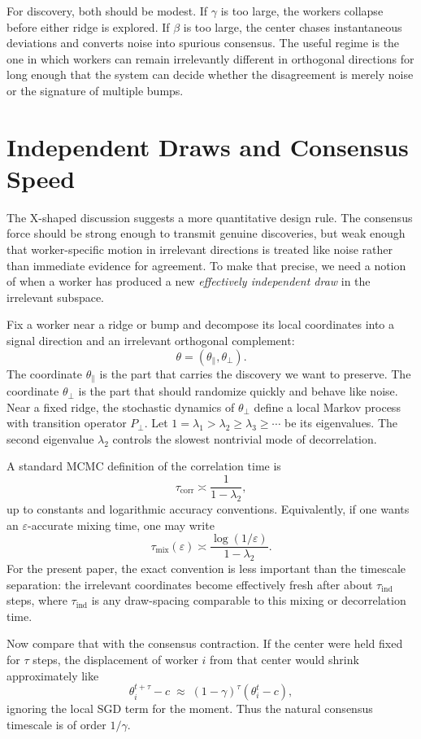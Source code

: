\documentclass{article}
\begin{document}
For discovery, both should be modest. If $\gamma$ is too large, the
workers collapse before either ridge is explored. If $\beta$ is too
large, the center chases instantaneous deviations and converts noise
into spurious consensus. The useful regime is the one in which workers
can remain irrelevantly different in orthogonal directions for long
enough that the system can decide whether the disagreement is merely
noise or the signature of multiple bumps.

\section{Independent Draws and Consensus Speed}

The X-shaped discussion suggests a more quantitative design rule. The
consensus force should be strong enough to transmit genuine discoveries,
but weak enough that worker-specific motion in irrelevant directions is
treated like noise rather than immediate evidence for agreement. To make
that precise, we need a notion of when a worker has produced a new
\emph{effectively independent draw} in the irrelevant subspace.

Fix a worker near a ridge or bump and decompose its local coordinates
into a signal direction and an irrelevant orthogonal complement:
\[
\theta = (\theta_{\parallel}, \theta_{\perp}).
\]
The coordinate $\theta_{\parallel}$ is the part that carries the
discovery we want to preserve. The coordinate $\theta_{\perp}$ is the
part that should randomize quickly and behave like noise. Near a fixed
ridge, the stochastic dynamics of $\theta_{\perp}$ define a local Markov
process with transition operator $P_{\perp}$. Let
$1 = \lambda_1 > \lambda_2 \geq \lambda_3 \geq \cdots$ be its
eigenvalues. The second eigenvalue $\lambda_2$ controls the slowest
nontrivial mode of decorrelation.

A standard MCMC definition of the correlation time is
\[
\tau_{\mathrm{corr}} \asymp \frac{1}{1-\lambda_2},
\]
up to constants and logarithmic accuracy conventions. Equivalently, if
one wants an $\varepsilon$-accurate mixing time, one may write
\[
\tau_{\mathrm{mix}}(\varepsilon)
\asymp \frac{\log(1/\varepsilon)}{1-\lambda_2}.
\]
For the present paper, the exact convention is less important than the
timescale separation: the irrelevant coordinates become effectively
fresh after about $\tau_{\mathrm{ind}}$ steps, where
$\tau_{\mathrm{ind}}$ is any draw-spacing comparable to this mixing or
decorrelation time.

Now compare that with the consensus contraction. If the center were held
fixed for $\tau$ steps, the displacement of worker $i$ from that center
would shrink approximately like
\[
\theta_i^{t+\tau} - c \;\approx\; (1-\gamma)^{\tau}(\theta_i^t-c),
\]
ignoring the local SGD term for the moment. Thus the natural consensus
timescale is of order $1/\gamma$.
\end{document}
